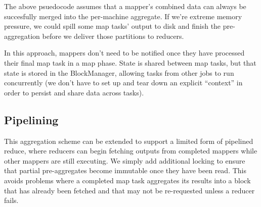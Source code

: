 \documentclass[12pt]{article}
\begin{document}
\begin{itemize}


\end{itemize}

The above psuedocode assumes that a mapper's combined data can always be
succesfully merged into the per-machine aggregate.  If we're extreme memory
pressure, we could spill some map tasks' output to disk and finish the
pre-aggregation before we deliver those partitions to reducers.

In this approach, mappers don't need to be notified once they have processed
their final map task in a map phase.  State is shared between map tasks, but
that state is stored in the BlockManager, allowing tasks from other jobs to
run concurrently (we don't have to set up and tear down an explicit
``context'' in order to persist and share data across tasks).

\subsection{Pipelining}

This aggregation scheme can be extended to support a limited form of pipelined
reduce, where reducers can begin fetching outputs from completed mappers while
other mappers are still executing.  We simply add additional locking to ensure
that partial pre-aggregates become immutable once they have been read.  This
avoids problems where a completed map task aggregates its results into a block
that has already been fetched and that may not be re-requested unless
a reducer fails.
\end{document}
